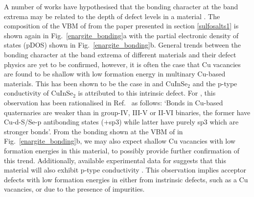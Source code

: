\documentclass[11pt, twoside]{report}
\begin{document}
A number of works have hypothesised that the bonding character at the band extrema may be related to the depth of defect levels in a material \cite{MAPI_defect_phys, Andriy_defect_tolerance, MIT_defect_tolerance}. The composition of the VBM of {\enargite} from the paper presented in section \ref{sulfosalts1} \cite{sulfosalts_paper} is shown again in Fig.~\ref{enargite_bonding}a with the partial electronic density of states (pDOS) shown in Fig.~\ref{enargite_bonding}b. General trends between the bonding character at the band extrema of different materials and their defect physics are yet to be confirmed, however, it is often the case that Cu vacancies are found to be shallow with low formation energy in multinary Cu-based materials. This has been shown to be the case in {\CZTS} \cite{defects_Chen_large} and CuInSe$_2$ \cite{Zhang_CIS} and the p-type conductivity of CuInSe$_2$ is attributed to this intrinsic defect. For {\CZTS}, this observation has been rationalised in Ref.~ as follows: `Bonds in Cu-based quaternaries are weaker than in group-IV, III-V or II-VI binaries, the former have Cu-d-S/Se-p antibonding states (+sp3) while latter have purely sp3 which are stronger bonds'.
From the bonding shown at the VBM of {\enargite} in Fig.~\ref{enargite_bonding}b, we may also expect shallow Cu vacancies with low formation energies in this material, to possibly provide further confirmation of this trend. Additionally, available experimental data for {\enargite} suggests that this material will also exhibit p-type conductivity \cite{enargite1995, sulfide_minerals_new}. This observation implies acceptor defects with low formation energies in {\enargite} either from instrinsic defects, such as a Cu vacancies, or due to the presence of impurities.

\end{document}
